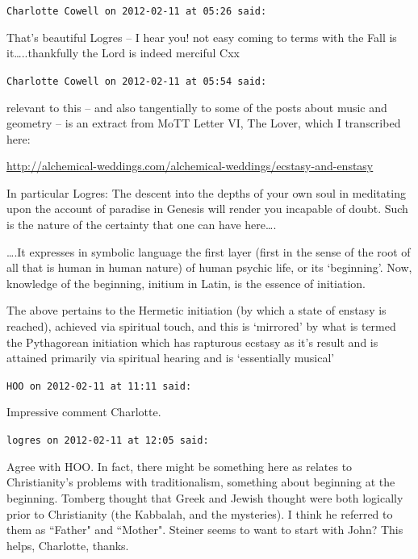 \begin{footnotesize}\begin{sffamily}



\texttt{Charlotte Cowell on 2012-02-11 at 05:26 said: }

That's beautiful Logres – I hear you! not easy coming to terms with the Fall is it…..thankfully the Lord is indeed merciful Cxx


\hfill

\texttt{Charlotte Cowell on 2012-02-11 at 05:54 said: }

relevant to this – and also tangentially to some of the posts about music and geometry – is an extract from MoTT Letter VI, The Lover, which I transcribed here:

\url{http://alchemical-weddings.com/alchemical-weddings/ecstasy-and-enstasy}

In particular Logres: The descent into the depths of your own soul in meditating upon the account of paradise in Genesis will render you incapable of doubt. Such is the nature of the certainty that one can have here….

….It expresses in symbolic language the first layer (first in the sense of the root of all that is human in human nature) of human psychic life, or its `beginning'. Now, knowledge of the beginning, initium in Latin, is the essence of initiation.

The above pertains to the Hermetic initiation (by which a state of enstasy is reached), achieved via spiritual touch, and this is `mirrored' by what is termed the Pythagorean initiation which has rapturous ecstasy as it's result and is attained primarily via spiritual hearing and is `essentially musical'


\hfill

\texttt{HOO on 2012-02-11 at 11:11 said: }

Impressive comment Charlotte.


\hfill

\texttt{logres on 2012-02-11 at 12:05 said: }

Agree with HOO. In fact, there might be something here as relates to Christianity's problems with traditionalism, something about beginning at the beginning. Tomberg thought that Greek and Jewish thought were both logically prior to Christianity (the Kabbalah, and the mysteries). I think he referred to them as ``Father" and ``Mother". Steiner seems to want to start with John? This helps, Charlotte, thanks.



\end{sffamily}
\end{footnotesize}
